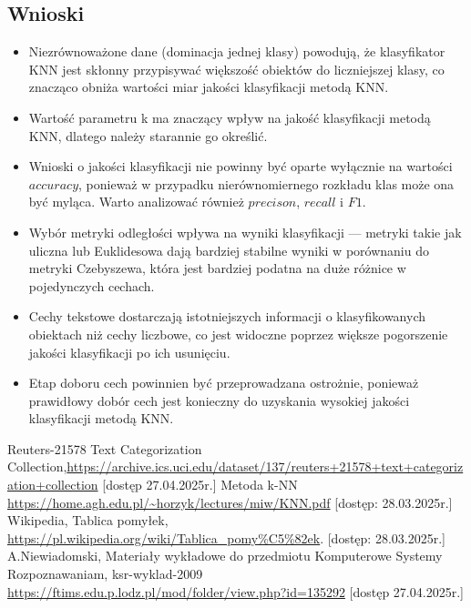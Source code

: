\documentclass{article}
\begin{document}
\subsection{Wnioski}
\begin{itemize}
    \item Niezrównoważone dane (dominacja jednej klasy) powodują, że klasyfikator KNN jest skłonny przypisywać większość obiektów do liczniejszej klasy, co znacząco obniża wartości miar jakości klasyfikacji metodą KNN.
    \item Wartość parametru k ma znaczący wpływ na jakość klasyfikacji metodą KNN, dlatego należy starannie go określić.
    \item Wnioski o jakości klasyfikacji nie powinny być oparte wyłącznie na wartości \(accuracy\), ponieważ w przypadku nierównomiernego rozkładu klas może ona być myląca. Warto analizować również \(precison\), \(recall\) i \(F1\).
    \item Wybór metryki odległości wpływa na wyniki klasyfikacji — metryki takie jak uliczna lub Euklidesowa dają bardziej stabilne wyniki w porównaniu do metryki Czebyszewa, która jest bardziej podatna na duże różnice w pojedynczych cechach.
    \item Cechy tekstowe dostarczają istotniejszych informacji o klasyfikowanych obiektach niż cechy liczbowe, co jest widoczne poprzez większe pogorszenie jakości klasyfikacji po ich usunięciu.
    \item Etap doboru cech powinnien być przeprowadzana ostrożnie, ponieważ prawidłowy dobór cech jest konieczny do uzyskania wysokiej jakości klasyfikacji metodą KNN.
\end{itemize}


\begin{thebibliography}{0}
 Reuters-21578 Text Categorization Collection,\url{https://archive.ics.uci.edu/dataset/137/reuters+21578+text+categorization+collection} [dostęp 27.04.2025r.]
 Metoda k-NN \url{https://home.agh.edu.pl/~horzyk/lectures/miw/KNN.pdf} [dostęp: 28.03.2025r.]
 Wikipedia, Tablica pomyłek, \url{https://pl.wikipedia.org/wiki/Tablica_pomy%C5%82ek}. [dostęp: 28.03.2025r.]
 A.Niewiadomski, Materiały wykładowe do przedmiotu Komputerowe Systemy Rozpoznawaniam, ksr-wyklad-2009 \url{https://ftims.edu.p.lodz.pl/mod/folder/view.php?id=135292} [dostęp 27.04.2025r.]
\end{thebibliography}
\end{document}
